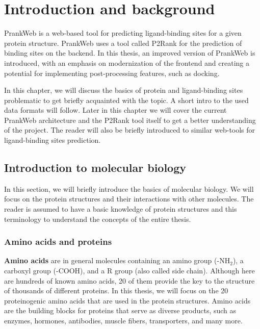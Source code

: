 \chapter{Introduction and background}
\label{chap:intro}

PrankWeb is a web-based tool for predicting ligand-binding sites for a given protein structure. PrankWeb uses a tool called P2Rank for the prediction of binding sites on the backend. In this thesis, an improved version of PrankWeb is introduced, with an emphasis on modernization of the frontend and creating a potential for implementing post-processing features, such as docking.

In this chapter, we will discuss the basics of protein and ligand-binding sites problematic to get briefly acquainted with the topic. A short intro to the used data formats will follow. Later in this chapter we will cover the current PrankWeb architecture and the P2Rank tool itself to get a better understanding of the project. The reader will also be briefly introduced to similar web-tools for ligand-binding sites prediction.

\section{Introduction to molecular biology}
\label{sec:mol_bio}

In this section, we will briefly introduce the basics of molecular biology. We will focus on the protein structures and their interactions with other molecules. The reader is assumed to have a basic knowledge of protein structures and this terminology to understand the concepts of the entire thesis.

\subsection{Amino acids and proteins}
\label{subsec:amino_acids}

\textbf{Amino acids} are in general molecules containing an amino group (-NH$_2$), a carboxyl group (-COOH), and a R group (also called side chain). Although here are hundreds of known amino acids, 20 of them provide the key to the structure of thousands of different proteins. In this thesis, we will focus on the 20 proteinogenic amino acids that are used in the protein structures. Amino acids are the building blocks for proteins that serve as diverse products, such as enzymes, hormones, antibodies, muscle fibers, transporters, and many more.

